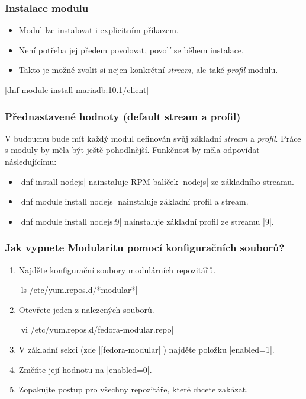 \documentclass[12pt]{beamer}
\begin{document}
\begin{frame}[fragile]
\frametitle{Instalace modulu}

\begin{itemize}
	\item Modul lze instalovat i explicitním příkazem.
	\item Není potřeba jej předem povolovat, povolí se během instalace.
	\item Takto je možné zvolit si nejen konkrétní \textit{stream}, ale také \textit{profil} modulu.
\end{itemize}

\begin{center}
	\tc|dnf module install mariadb:10.1/client|
\end{center}

\end{frame}

\begin{frame}[fragile]
\frametitle{Přednastavené hodnoty (default stream a profil)}

V budoucnu bude mít každý modul definován svůj základní \textit{stream} a \textit{profil}. Práce s moduly by měla být ještě pohodlnější. Funkčnost by měla odpovídat následujícímu:

\begin{itemize}
	\item \tc|dnf install nodejs| nainstaluje RPM balíček \tc|nodejs| ze základního streamu.
	\item \tc|dnf module install nodejs| nainstaluje základní profil a stream.
	\item \tc|dnf module install nodejs:9| nainstaluje základní profil ze streamu \tc|9|.
\end{itemize}
\end{frame}

\begin{frame}[fragile]
\frametitle{Jak vypnete Modularitu pomocí konfiguračních souborů?}

\begin{enumerate}
	\item Najděte konfigurační soubory modulárních repozitářů.
	
	\tc|ls /etc/yum.repos.d/*modular*|
	\item Otevřete jeden z nalezených souborů.
	
	\tc|vi /etc/yum.repos.d/fedora-modular.repo|
	\item V základní sekci (zde \tc|[fedora-modular]|) najděte položku \tc|enabled=1|.
	\item Změňte její hodnotu na \tc|enabled=0|.
	\item Zopakujte postup pro všechny repozitáře, které chcete zakázat.
\end{enumerate}
\end{frame}
\end{document}
